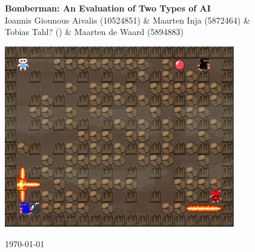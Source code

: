 

\begin{center}
\Huge \textbf{Bomberman: An Evaluation of Two Types of AI}\\
\vspace*{0.8cm}
\Large Ioannis Giounous Aivalis (10524851) \& Maarten Inja (5872464) \& \\ Tobias Tahl? () \& Maarten de Waard (5894883) 

\vspace*{4cm}

\includegraphics[width=10cm]{resources/bbman}

\vfill
\today

\end{center}
\thispagestyle{empty}
